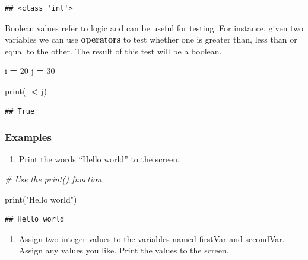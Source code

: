 \documentclass[
]{book}
\newenvironment{Shaded}{\begin{snugshade}}{\end{snugshade}}
\newcommand{\BuiltInTok}[1]{#1}
\newcommand{\CommentTok}[1]{\textcolor[rgb]{0.56,0.35,0.01}{\textit{#1}}}
\newcommand{\DecValTok}[1]{\textcolor[rgb]{0.00,0.00,0.81}{#1}}
\newcommand{\NormalTok}[1]{#1}
\newcommand{\OperatorTok}[1]{\textcolor[rgb]{0.81,0.36,0.00}{\textbf{#1}}}
\newcommand{\StringTok}[1]{\textcolor[rgb]{0.31,0.60,0.02}{#1}}
\providecommand{\tightlist}{%
  \setlength{\itemsep}{0pt}\setlength{\parskip}{0pt}}
\begin{document}
\begin{verbatim}
## <class 'int'>
\end{verbatim}

Boolean values refer to logic and can be useful for testing. For instance, given two variables we can use \textbf{operators} to test whether one is greater than, less than or equal to the other. The result of this test will be a boolean.

\begin{Shaded}
\begin{Highlighting}[]
\NormalTok{i }\OperatorTok{=} \DecValTok{20}
\NormalTok{j }\OperatorTok{=} \DecValTok{30}

\BuiltInTok{print}\NormalTok{(i }\OperatorTok{\textless{}}\NormalTok{ j)}
\end{Highlighting}
\end{Shaded}

\begin{verbatim}
## True
\end{verbatim}

\hypertarget{examples}{%
\subsubsection{Examples}\label{examples}}

\begin{enumerate}
\def\labelenumi{\arabic{enumi}.}
\tightlist
\item
  Print the words ``Hello world'' to the screen.
\end{enumerate}

\begin{Shaded}
\begin{Highlighting}[]
\CommentTok{\# Use the print() function.}

\BuiltInTok{print}\NormalTok{(}\StringTok{"Hello world"}\NormalTok{)}
\end{Highlighting}
\end{Shaded}

\begin{verbatim}
## Hello world
\end{verbatim}

\begin{enumerate}
\def\labelenumi{\arabic{enumi}.}
\setcounter{enumi}{1}
\tightlist
\item
  Assign two integer values to the variables named firstVar and secondVar. Assign any values you like. Print the values to the screen.
\end{enumerate}
\end{document}
